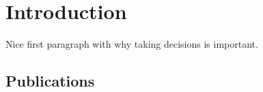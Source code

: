 \chapter{Introduction}\label{ch:introduction}

Nice first paragraph with why taking decisions is important.

\section{Publications}